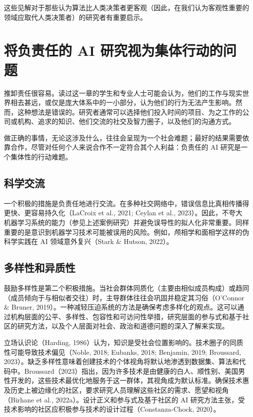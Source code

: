 这些见解对于那些认为算法比人类决策者更客观（因此，在我们认为客观性重要的领域应取代人类决策者）的研究者有重要启示。


\section{将负责任的 AI 研究视为集体行动的问题}
推卸责任很容易。读过这一章的学生和专业人士可能会认为，他们的工作与现实世界相去甚远，或仅是庞大体系中的一小部分，认为他们的行为无法产生影响。然而，这种想法是错误的。研究者通常可以选择他们投入时间的项目、为之工作的公司或机构、追求的知识、他们交流的社交及智力圈子，以及他们的沟通方式。

做正确的事情，无论这涉及什么，往往会呈现为一个社会难题；最好的结果需要依靠合作，尽管对任何个人来说合作不一定符合其个人利益：负责任的 AI 研究是一个集体性的行动难题。

\subsection{科学交流}
一个积极的措施是负责任地进行交流。在多种社交网络中，错误信息比真相传播得更快、更容易持久化（LaCroix et al., 2021; Ceylan et al., 2023）。因此，不夸大机器学习系统的能力（参见上述案例研究）并避免误导性的拟人化非常重要。同样重要的是意识到机器学习技术可能被误用的风险。例如，颅相学和面相学这样的伪科学实践在 AI 领域意外复兴（Stark \& Hutson, 2022）。

\subsection{多样性和异质性}
鼓励多样性是第二个积极措施。当社会群体同质化（主要由相似成员构成）或趋同（成员倾向于与相似者交往）时，主导群体往往会巩固并稳定其习俗（O’Connor \& Bruner, 2019）。一种减轻压迫系统的方法是确保考虑多样化的观点。这可以通过机构层面的公平、多样性、包容性和可访问性举措，研究层面的参与式和基于社区的研究方法，以及个人层面对社会、政治和道德问题的深入了解来实现。

立场认识论（Harding, 1986）认为，知识是受社会位置影响的。技术圈子的同质性可能导致技术偏见（Noble, 2018; Eubanks, 2018; Benjamin, 2019; Broussard, 2023）。缺乏多样性意味着创建技术的个体视角将默认地渗透到数据集、算法和代码中。Broussard（2023）指出，因为许多技术是由健康的白人、顺性别、美国男性开发的，这些技术最优化地服务于这一群体，其视角成为默认标准。确保技术惠及历史上被边缘化的社区，要求研究人员理解这些社区的需求、愿望和视角（Birhane et al., 2022a）。设计正义和参与式及基于社区的 AI 研究方法主张，受技术影响的社区应积极参与技术的设计过程（Constanza-Chock, 2020）。

